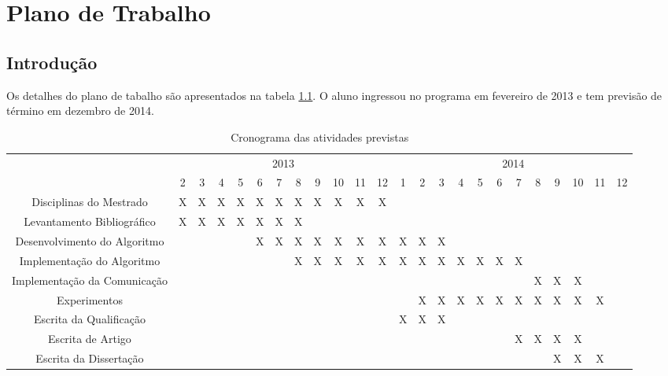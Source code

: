 \pagestyle{empty}
\cleardoublepage
\pagestyle{fancy}

\chapter{Plano de Trabalho}\label{cap7}

\section{Introdução}\label{cap7:intro}

Os detalhes do plano de tabalho são apresentados na tabela \ref{t_cronograma}. O aluno
ingressou no programa em fevereiro de 2013 e tem previsão de término em dezembro
de 2014.

\begin{table}[!htpb]
\centering

\begin{small}

\setlength{\tabcolsep}{2pt}

\begin{tabular}{|c|c|c|c|c|c|c|c|c|c|c|c|c|c|c|c|c|c|c|c|c|c|c|c|} \hline

 & \multicolumn{11}{c|}{2013}  & \multicolumn{12}{c|}{2014}   \\ \cline{2-22}
\raisebox{1.5ex}{Etapa} & 2 & 3 & 4  & 5 & 6 & 7 & 8 & 9 & 10 & 11 & 12 & 1 & 2 & 3 & 4 & 5 & 6 & 7 & 8 & 9 & 10 & 11 & 12 \\ \hline

Disciplinas do Mestrado & X & X & X & X & X & X & X & X & X & X & X & & & & & & & & & & & & \\ \hline
Levantamento Bibliográfico & X & X & X & X & X & X & X & & & & & & & & & & & & & & & & \\ \hline
Desenvolvimento do Algoritmo & & & & & X & X & X & X & X & X & X & X & X & X & & & & & & & & & \\ \hline
Implementação do Algoritmo & & & & & & & X & X & X & X & X & X & X & X & X & X & X & X & & & & & \\ \hline
Implementação da Comunicação & & & & & & &  &  & &  &  &  &  &  & &  &  &  & X & X & X & & \\ \hline
Experimentos & & & & & & & & & & & & & X & X & X & X & X & X & X & X & X & X & \\ \hline
Escrita da Qualificação & & &  & & & & & & & & & X & X & X & & & & & & & & & \\ \hline
Escrita de Artigo & & & & & & & & & & & & & & & & & & X & X & X & X & & \\ \hline
Escrita da Dissertação & & & & & &  & & & & & & & & & & & & & & X & X & X &  \\ \hline

\end{tabular}
\end{small}
\caption{Cronograma das atividades previstas}
\label{t_cronograma}
\end{table}







